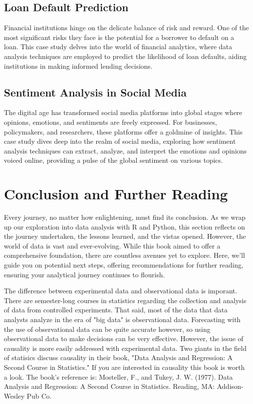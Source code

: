 \documentclass{book}
\begin{document}
\section{Loan Default Prediction}
Financial institutions hinge on the delicate balance of risk and reward. One of the most significant risks they face is the potential for a borrower to default on a loan. This case study delves into the world of financial analytics, where data analysis techniques are employed to predict the likelihood of loan defaults, aiding institutions in making informed lending decisions.

\section{Sentiment Analysis in Social Media}
The digital age has transformed social media platforms into global stages where opinions, emotions, and sentiments are freely expressed. For businesses, policymakers, and researchers, these platforms offer a goldmine of insights. This case study dives deep into the realm of social media, exploring how sentiment analysis techniques can extract, analyze, and interpret the emotions and opinions voiced online, providing a pulse of the global sentiment on various topics.

\chapter*{Conclusion and Further Reading}
Every journey, no matter how enlightening, must find its conclusion. As we wrap up our exploration into data analysis with R and Python, this section reflects on the journey undertaken, the lessons learned, and the vistas opened. However, the world of data is vast and ever-evolving. While this book aimed to offer a comprehensive foundation, there are countless avenues yet to explore. Here, we'll guide you on potential next steps, offering recommendations for further reading, ensuring your analytical journey continues to flourish.

The difference between experimental data and observational data is imporant. There are semester-long courses in statistics regarding the collection and analysis of data from controlled experiments. That said, most of the data that data analysts analyze in the era of "big data" is observational data. Forecasting with the use of observational data can be quite accurate however, so using observational data to make decisions can be very effective. However, the issue of causality is more easily addressed with experimental data. Two giants in the field of statisics discuss causality in their book, "Data Analysis and Regression: A Second Course in Statistics." If you are interested in causality this book is worth a look. The book's reference is: Mosteller, F., and Tukey, J. W. (1977). Data Analysis and Regression: A Second Course in Statistics. Reading, MA: Addison-Wesley Pub Co.

\printbibliography
\end{document}
